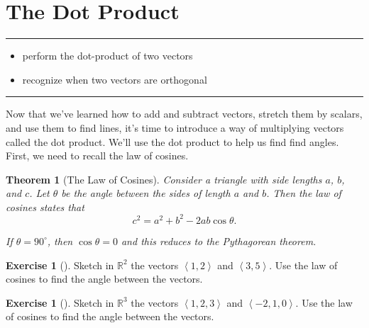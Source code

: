 \documentclass[10pt,]{book}
\theoremstyle{plain}
\newtheorem{theorem}{Theorem}[section]
\theoremstyle{definition}
\theoremstyle{definition}
\theoremstyle{definition}
\theoremstyle{definition}
\newtheorem{exploration}[project]{Exercise}
\newenvironment{objectives}[1]{\noindent\rule{\linewidth}{0.1ex}\newline{\textbf{{\large#1}}\par\smallskip}}{\par\noindent\rule{\linewidth}{0.1ex}\par\smallskip}
\theoremstyle{definition}
\numberwithin{equation}{section}
\newcommand{\lt}{<}
\begin{document}
\section[{The Dot Product}]{The Dot Product}\label{ch02_2_dotproduct}
\begin{objectives}{Objectives: Topical}\label{objectives-4}
%
\begin{itemize}[label=\textbullet]
\item{}perform the dot-product of two vectors%
\item{}recognize when two vectors are orthogonal%
\end{itemize}
\end{objectives}
Now that we've learned how to add and subtract vectors, stretch them by scalars, and use them to find lines, it's time to introduce a way of multiplying vectors called the dot product. We'll use the dot product to help us find find angles. First, we need to recall the law of cosines.%
\begin{theorem}[{The Law of Cosines}]\label{law_of_cosines}
Consider a triangle with side lengths \(a\), \(b\), and \(c\). Let \(\theta\) be the angle between the sides of \emph{length} \(a\) and \(b\). Then the law of cosines states that%
\begin{equation*}
c^2=a^2+b^2-2ab\cos\theta.
\end{equation*}
%
\par
If \(\theta=90^\circ\), then \(\cos\theta=0\) and this reduces to the Pythagorean theorem.%
\end{theorem}
\begin{exploration}[]\label{exploration-29}
Sketch in \(\mathbb{R}^2\) the vectors \(\left\lt 1,2\right>\) and \(\left\lt 3,5\right>\). Use the law of cosines to find the angle between the vectors.%
\end{exploration}
\begin{exploration}[]\label{prob_dot_angle_practice}
Sketch in \(\mathbb{R}^3\) the vectors \(\left\lt 1,2,3\right>\) and \(\left\lt -2,1,0\right>\). Use the law of cosines to find the angle between the vectors.%
\end{exploration}
\typeout{************************************************}
\typeout{************************************************}
\end{document}
